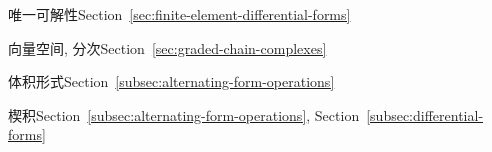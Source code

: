\begin{theindex}
\item {}\label{index:unisolvence}{唯一可解性}\quad Section~\ref{sec:finite-element-differential-forms}

\item {}\label{index:vector-space-graded}{向量空间, 分次}\quad Section~\ref{sec:graded-chain-complexes}

\item {}\label{index:volume-form}{体积形式}\quad Section~\ref{subsec:alternating-form-operations}

\item {}\label{index:wedge-product}{楔积}\quad Section~\ref{subsec:alternating-form-operations}, Section~\ref{subsec:differential-forms}
\end{theindex}

